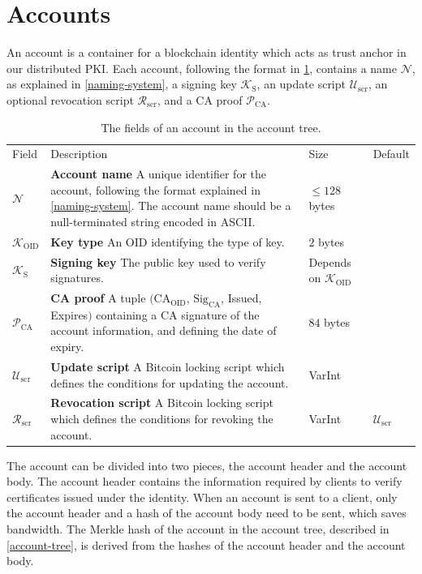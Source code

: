 \documentclass{style/kththesis}
\begin{document}
\section{Accounts}
An account is a container for a blockchain identity which acts as trust anchor in our distributed PKI. Each account, following the format in \cref{tab:account-fields}, contains a name $\mathcal{N}$, as explained in \cref{naming-system}, a signing key $\mathcal{K}_{\text{S}}$, an update script $\mathcal{U}_{\text{scr}}$, an optional revocation script $\mathcal{R}_{\text{scr}}$, and a CA proof $\mathcal{P}_{\text{CA}}$.

\begin{table}
\caption{The fields of an account in the account tree.}
\label{tab:account-fields}
\begin{tabularx}{\linewidth}{lXll}
\cmidrule(r){1-4}
Field & Description & Size & Default \\ 
\cmidrule(r){1-4}
\rowcolor{Cornsilk} $\mathcal{N}$ & \textbf{Account name} A unique identifier for the account, following the format explained in \cref{naming-system}. The account name should be a null-terminated string encoded in ASCII. & $\leq 128$ bytes & \\
\rowcolor{Cornsilk} $\mathcal {K}_{\text{OID}}$ & \textbf{Key type} An OID identifying the type of key. & $2$ bytes & \\
\rowcolor{Cornsilk} $\mathcal{K}_{\text{S}}$ & \textbf{Signing key} The public key used to verify signatures. & Depends on $\mathcal {K}_{\text{OID}}$ & \\
$\mathcal{P}_{\text{CA}}$ & \textbf{CA proof} A tuple $(\text{CA}_\text{OID}$, $\text{Sig}_{\text{CA}}$, Issued, Expires$)$ containing a CA signature of the account information, and defining the date of expiry. & $84$ bytes & \\
$\mathcal{U}_{\text{scr}}$ & \textbf{Update script} A Bitcoin locking script which defines the conditions for updating the account. & VarInt & \\
$\mathcal{R}_{\text{scr}}$ & \textbf{Revocation script} A Bitcoin locking script which defines the conditions for revoking the account. & VarInt & $\mathcal{U}_{\text{scr}}$ \\
\end{tabularx}
\end{table}

The account can be divided into two pieces, the account header and the account body. The account header contains the information required by clients to verify certificates issued under the identity. When an account is sent to a client, only the account header and a hash of the account body need to be sent, which saves bandwidth. The Merkle hash of the account in the account tree, described in \cref{account-tree}, is derived from the hashes of the account header and the account body.
\end{document}
